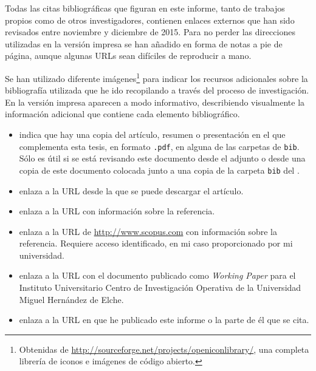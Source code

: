 \ABIERTO


Todas las citas bibliográficas que figuran en este informe, tanto de trabajos propios como de otros investigadores, contienen enlaces externos que han sido revisados entre noviembre y diciembre de 2015. Para no perder las direcciones utilizadas en la versión impresa se han añadido en forma de notas a pie de página, aunque algunas URLs sean difíciles de reproducir a mano.

Se han utilizado diferente imágenes\footnote{Obtenidas de \href{http://sourceforge.net/projects/openiconlibrary/}{http://sourceforge.net/projects/openiconlibrary/}, una completa librería de iconos e imágenes de código abierto.} para indicar los recursos adicionales sobre la bibliografía utilizada que he ido recopilando a través del proceso de investigación. En la versión impresa aparecen a modo informativo, describiendo visualmente la información adicional que contiene cada elemento bibliográfico.
 
\begin{itemize}
	\item[\iconoPDF] indica que hay una copia del artículo, resumen o presentación en el \dvdAdjunto que complementa esta tesis, en formato \texttt{.pdf}, en alguna de las carpetas de \texttt{bib}. Sólo es útil si se está revisando este documento desde el \dvdAdjunto adjunto o desde una copia de este documento colocada junto a una copia de la carpeta \texttt{bib} del \dvdAdjunto.
  \item[\iconoDescarga] enlaza a la URL desde la que se puede descargar el artículo.
  \item[\iconoWWW] enlaza a la URL con información sobre la referencia.
  \item[\iconoSCOPUS] enlaza a la URL de \url{http://www.scopus.com} con información sobre la referencia. Requiere acceso identificado, en mi caso proporcionado por mi universidad.
  \item[\logoCIO] enlaza a la URL con el documento publicado como \textsl{Working Paper} para el Instituto Universitario Centro de Investigación Operativa de la Universidad Miguel Hernández de Elche.
  \item[\logoGitHub] enlaza a la URL en que he publicado este informe o la parte de él que se cita.
\end{itemize}

